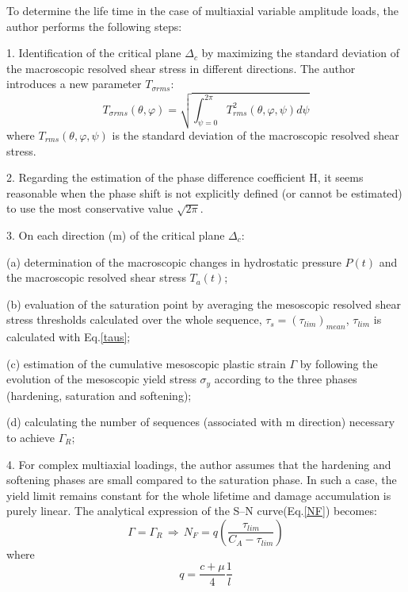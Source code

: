 \documentclass[3p,times,procedia,number]{elsarticle}
\begin{document}
To determine the life time in the case of multiaxial variable amplitude loads, the author performs the following steps:
\begin{flushleft}
	
	1. Identification of the critical plane $\Delta_c$ by maximizing the standard deviation of the macroscopic resolved shear stress in different directions. The author introduces a new parameter $T_{\sigma rms}$:
	\begin{equation}
	T_{\sigma rms}(\theta,\varphi)=\sqrt{\int_{\psi=0}^{2\pi}T_{rms}^2(\theta,\varphi,\psi)d\psi}
	\label{srms}
	\end{equation}
	where $T_{rms}(\theta,\varphi,\psi)$ is the standard deviation of the macroscopic resolved shear stress.
	\vspace{8pt}
	
	2. Regarding the estimation of the phase difference coefficient H, it seems reasonable when the phase shift is not
	explicitly defined (or cannot be estimated) to use the
	most conservative value $\sqrt{2\pi}$.
	\vspace{8pt}
	
	3. On each direction (m) of the critical plane $\Delta_c$:
	\vspace{6pt}
	
	(a) determination of the macroscopic changes in hydrostatic pressure $P(t)$ and the macroscopic resolved shear stress $T_a(t)$;
	\vspace{6pt}
	
	(b) evaluation of the saturation point by averaging the mesoscopic resolved shear stress thresholds calculated over
	the whole sequence, $\tau_{s}=(\tau_{lim})_{mean}$, $\tau_{lim}$ is calculated with Eq.\eqref{taus};
	\vspace{6pt}
	
	(c) estimation of the cumulative mesoscopic plastic strain $\Gamma$ by following the evolution of the mesoscopic yield stress $\sigma_y$  according to the three phases (hardening, saturation and softening);
	\vspace{6pt}
	
	(d) calculating the number of sequences (associated with m direction) necessary to achieve $\Gamma_R$;
	\vspace{6pt}
	
	4.  For complex multiaxial loadings, the author assumes that the hardening
	and softening phases are small compared to the saturation phase\cite{Morel2000101}. In such a case, the yield limit remains constant for the whole lifetime and damage accumulation is purely linear. The analytical expression of the S–N curve(Eq.\eqref{NF}) becomes:
	\begin{equation}
	\Gamma=\Gamma_R \, \Rightarrow \, N_F=q\left(\frac{\tau_{lim}}{C_A-\tau_{lim}}\right)
	\label{NFsimple}
	\end{equation}
	where$$q=\frac{c+\mu}{4}\frac{1}{l}$$
	

\end{flushleft}
\end{document}
